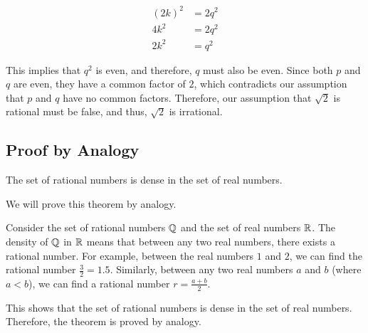 \begin{align*}
{(2k)}^2 &= 2q^2\\	
4k^2 &= 2q^2\\
2k^2 &= q^2
\end{align*}

This implies that \( q^2 \) is even, and therefore, \( q \) must also be even.
Since both \( p \) and \( q \) are even, they have a common factor of \( 2 \), which contradicts our assumption that \( p \) and \( q \) have no common factors.
Therefore, our assumption that \( \sqrt{2} \) is rational must be false, and thus, \( \sqrt{2} \) is irrational.

\QED

\subsection{Proof by Analogy}

The set of rational numbers is dense in the set of real numbers.

We will prove this theorem by analogy.
\vspace{\baselineskip}
	
Consider the set of rational numbers \( \mathbb{Q} \) and the set of real numbers \( \mathbb{R} \). The density of \( \mathbb{Q} \) in \( \mathbb{R} \) means that between any two real numbers, there exists a rational number.
For example, between the real numbers \( 1 \) and \( 2 \), we can find the rational number \( \frac{3}{2} = 1.5 \). Similarly, between any two real numbers \( a \) and \( b \) (where \( a < b \)), we can find a rational number \( r = \frac{a + b}{2} \).
\vspace{\baselineskip}

This shows that the set of rational numbers is dense in the set of real numbers.
Therefore, the theorem is proved by analogy.

\QED


